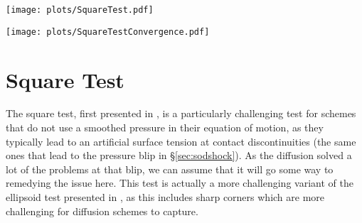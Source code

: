 \begin{figure*}
    \centering
    \texttt{[image: plots/SquareTest.pdf]}
    \caption{Maps of various quantities in the 2D square test at $t=4$;
    beyond this all schemes are stable. The white dashed line shows the
    initial boundary of the square; this should be a stable configuration. Of
    particular note is the rightmost panel which shows the pressure across
    the medium; blips here will result in artificial surface tension, causing
    the square to slowly morph into a circle. Each plot has an individual
    normalisation for the colour map, as otherwise no structure can be seen
    for any scheme apart from Density-Energy in the pressure panel. The
    structure seen in \anarchy{}-PU scheme is a set of spurious pressure
    waves present since the initial conditions that constantly propagate
    through the medium.}
    \label{fig:squaretest}
\end{figure*}

\begin{figure*}
    \centering
    \texttt{[image: plots/SquareTestConvergence.pdf]}
    \vspace{-1.0cm}
    \caption{Convergence with resolution for the density in the square test
    (Figure \ref{fig:squaretest}) for the \anarchy{}-DU scheme. Here we see
    that the smooth region created by the diffusion converges towards an
    infinitely small width as a function of resolution, and at high
    resolution this scheme is able to completely capture the expected
    behaviour in this test.}
    \label{fig:squareconvergence}
\end{figure*}

\section{Square Test}
\label{sec:squaretest}


The square test, first presented in \citet{Hopkins2013}, is a particularly
challenging test for schemes that do not use a smoothed pressure in their
equation of motion, as they typically lead to an artificial surface
tension at contact discontinuities (the same ones that lead to the pressure
blip in \S \ref{sec:sodshock}). As the diffusion solved a lot of the problems
at that blip, we can assume that it will go some way to remedying the issue
here. This test is actually a more challenging variant of the ellipsoid test
presented in \citet{Hess2010}, as this includes sharp corners which are
more challenging for diffusion schemes to capture. 

